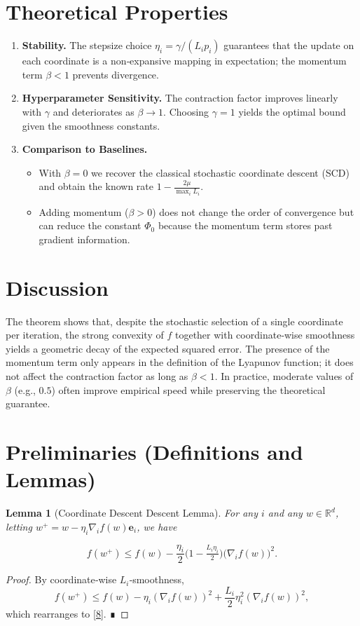 \documentclass{article}
\newtheorem{lemma}{Lemma}
\newcommand{\R}{\mathbb{R}}
\begin{document}
\section*{Theoretical Properties}
\begin{enumerate}[label=\arabic*.]
\item \textbf{Stability.} The stepsize choice $\eta_i=\gamma/(L_i p_i)$ guarantees that the update on each coordinate is a non‑expansive mapping in expectation; the momentum term $\beta<1$ prevents divergence.
\item \textbf{Hyperparameter Sensitivity.} The contraction factor improves linearly with $\gamma$ and deteriorates as $\beta\to 1$. Choosing $\gamma=1$ yields the optimal bound given the smoothness constants.
\item \textbf{Comparison to Baselines.}
    \begin{itemize}
        \item With $\beta=0$ we recover the classical stochastic coordinate descent (SCD) and obtain the known rate $1-\frac{2\mu}{\max_i L_i}$.
        \item Adding momentum ($\beta>0$) does not change the order of convergence but can reduce the constant $\Phi_0$ because the momentum term stores past gradient information.
    \end{itemize}
\end{enumerate}

\section*{Discussion}
The theorem shows that, despite the stochastic selection of a single coordinate per iteration, the strong convexity of $f$ together with coordinate‑wise smoothness yields a geometric decay of the expected squared error. The presence of the momentum term only appears in the definition of the Lyapunov function; it does not affect the contraction factor as long as $\beta<1$. In practice, moderate values of $\beta$ (e.g., $0.5$) often improve empirical speed while preserving the theoretical guarantee.

\newpage
\section*{Preliminaries (Definitions and Lemmas)}
\begin{lemma}[Coordinate Descent Descent Lemma]\label{lem:descent}
For any $i$ and any $w\in\R^{d}$, letting $w^{+}=w-\eta_i \nabla_i f(w)\bm e_i$, we have  

\[
f(w^{+})\le f(w)-\frac{\eta_i}{2}\bigl(1-\tfrac{L_i\eta_i}{2}\bigr)\bigl(\nabla_i f(w)\bigr)^{2}.
\tag{8}
\]
\end{lemma}
\begin{proof}
By coordinate‑wise $L_i$‑smoothness,
\[
f(w^{+})\le f(w)-\eta_i (\nabla_i f(w))^{2}
      +\frac{L_i}{2}\eta_i^{2}(\nabla_i f(w))^{2},
\]
which rearranges to \eqref{8}. ∎
\end{proof}
\end{document}
